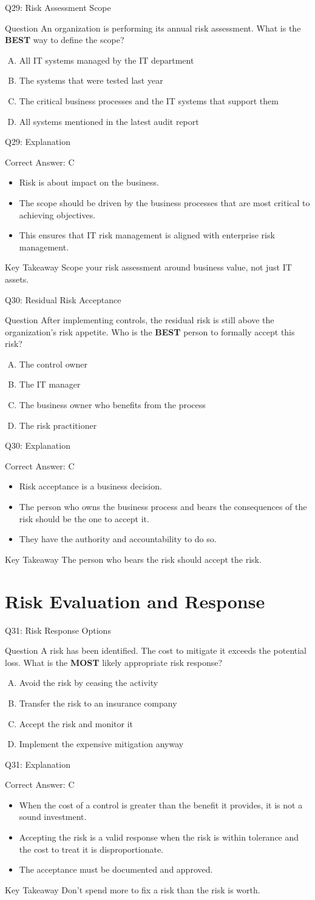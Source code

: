 \documentclass[aspectratio=169]{beamer}
\newcommand{\hq}[7]{%
	\begin{frame}{Q#1: #2}
		\begin{block}{Question}
			#3
		\end{block}
		\begin{enumerate}[(A)]
			#4
		\end{enumerate}
	\end{frame}
	\begin{frame}{Q#1: Explanation}
		\begin{block}{Correct Answer: #5}
			\begin{itemize}
				#6
			\end{itemize}
		\end{block}
		\begin{alertblock}{Key Takeaway}
			#7
		\end{alertblock}
	\end{frame}
}
\begin{document}
	\hq{29}{Risk Assessment Scope}
	{An organization is performing its annual risk assessment. What is the \textbf{BEST} way to define the scope?}
	{\item All IT systems managed by the IT department
		\item The systems that were tested last year
		\item The critical business processes and the IT systems that support them
		\item All systems mentioned in the latest audit report}
	{C}
	{\item Risk is about impact on the business.
		\item The scope should be driven by the business processes that are most critical to achieving objectives.
		\item This ensures that IT risk management is aligned with enterprise risk management.}
	{Scope your risk assessment around business value, not just IT assets.}
	
	\hq{30}{Residual Risk Acceptance}
	{After implementing controls, the residual risk is still above the organization's risk appetite. Who is the \textbf{BEST} person to formally accept this risk?}
	{\item The control owner
		\item The IT manager
		\item The business owner who benefits from the process
		\item The risk practitioner}
	{C}
	{\item Risk acceptance is a business decision.
		\item The person who owns the business process and bears the consequences of the risk should be the one to accept it.
		\item They have the authority and accountability to do so.}
	{The person who bears the risk should accept the risk.}
	
	\section{Risk Evaluation and Response}
	
	\hq{31}{Risk Response Options}
	{A risk has been identified. The cost to mitigate it exceeds the potential loss. What is the \textbf{MOST} likely appropriate risk response?}
	{\item Avoid the risk by ceasing the activity
		\item Transfer the risk to an insurance company
		\item Accept the risk and monitor it
		\item Implement the expensive mitigation anyway}
	{C}
	{\item When the cost of a control is greater than the benefit it provides, it is not a sound investment.
		\item Accepting the risk is a valid response when the risk is within tolerance and the cost to treat it is disproportionate.
		\item The acceptance must be documented and approved.}
	{Don't spend more to fix a risk than the risk is worth.}
	
\end{document}
